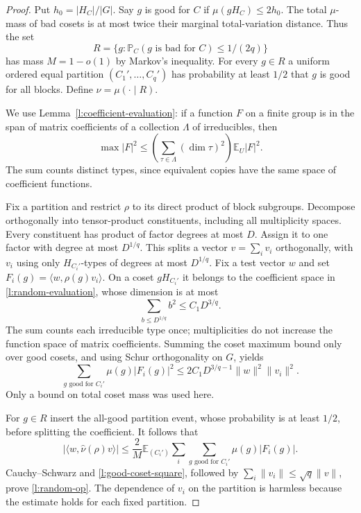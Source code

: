 \begin{proof}
Put $h_0=|H_C|/|G|$.  Say $g$ is good for $C$ if
$\mu(gH_C)\le2h_0$.  The total $\mu$-mass of bad cosets is at most
twice their marginal total-variation distance.  Thus the set
\[
 R=\{g:\mathbb P_C(g\text{ is bad for }C)\le1/(2q)\}
\]
has mass $M=1-o(1)$ by Markov's inequality.  For every $g\in R$ a
uniform ordered equal partition $(C_1',\ldots,C_q')$ has probability
at least $1/2$ that $g$ is good for all blocks.  Define
$\nu=\mu(\cdot\mid R)$.

We use Lemma~\ref{l:coefficient-evaluation}: if a function $F$ on
a finite group is in the span of matrix coefficients of a collection
$\Lambda$ of irreducibles, then
\begin{equation}\label{l:random-evaluation}
 \max|F|^2\le
 \left(\sum_{\tau\in\Lambda}(\dim\tau)^2\right)
                     \mathbb E_U|F|^2.
\end{equation}
The sum counts distinct types, since equivalent copies have the same
space of coefficient functions.

Fix a partition and restrict $\rho$ to its direct product of block
subgroups.  Decompose orthogonally into tensor-product constituents,
including all multiplicity spaces.  Every constituent has product
of factor degrees at most $D$.  Assign it to one factor with degree
at most $D^{1/q}$.  This splits a vector $v=\sum_i v_i$
orthogonally, with $v_i$ using only $H_{C_i'}$-types of degrees at
most $D^{1/q}$.  Fix a test vector $w$ and set
$F_i(g)=\langle w,\rho(g)v_i\rangle$.  On a coset $gH_{C_i'}$
it belongs to the coefficient space in
\eqref{l:random-evaluation}, whose dimension is at most
\[
 \sum_{b\le D^{1/q}}b^2\le C_1D^{3/q}.
\]
The sum counts each irreducible type once; multiplicities do not
increase the function space of matrix coefficients.  Summing the
coset maximum bound only over good cosets, and using Schur
orthogonality on $G$, yields
\begin{equation}\label{l:good-coset-square}
 \sum_{g\text{ good for }C_i'}\mu(g)|F_i(g)|^2
 \le2C_1D^{3/q-1}\|w\|^2\|v_i\|^2.
\end{equation}
Only a bound on total coset mass was used here.

For $g\in R$ insert the all-good partition event, whose probability
is at least $1/2$, before splitting the coefficient.  It follows that
\[
 |\langle w,\widehat\nu(\rho)v\rangle|
 \le\frac2M\mathbb E_{(C_i')}
      \sum_i\sum_{g\text{ good for }C_i'}\mu(g)|F_i(g)|.
\]
Cauchy--Schwarz and \eqref{l:good-coset-square}, followed by
$\sum_i\|v_i\|\le\sqrt q\|v\|$, prove
\eqref{l:random-op}.  The dependence of $v_i$ on the partition
is harmless because the estimate holds for each fixed partition.


\end{proof}
